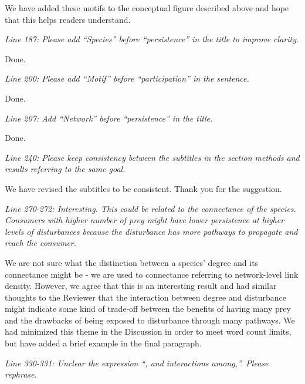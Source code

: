 \documentclass[12pt]{article}
\newcommand{\us}{\rm \setlength{\leftskip}{0.3cm} \setlength{\rightskip}{0.3cm}}
\newcommand{\them}{\it \setlength{\leftskip}{0cm} \setlength{\rightskip}{0cm}}
\begin{document}
        \us We have added these motifs to the conceptual figure described above and hope that this helps readers understand.
        
        \them
        Line 187: Please add ``Species'' before ``persistence'' in the title to improve clarity.
        
        \us
        Done.
        
        \them
        Line 200: Please add ``Motif'' before ``participation'' in the sentence.
        
        \us
        Done.
        
        \them
        Line 207: Add ``Network'' before ``persistence'' in the title.
        
        \us
        Done.
        
        \them
        Line 240: Please keep consistency between the subtitles in the section methods and results referring to the same goal.
        
        \us We have revised the subtitles to be consistent. Thank you for the suggestion.
        
        \them
        Line 270-272: Interesting. This could be related to the connectance of the species. Consumers with higher number of prey might have lower persistence at higher levels of disturbances because the disturbance has more pathways to propagate and reach the consumer.
        
        \us We are not sure what the distinction between a species' degree and its connectance might be - we are used to connectance referring to network-level link density. 
        However, we agree that this is an interesting result and had similar thoughts to the Reviewer that the interaction between degree and disturbance might indicate some kind of trade-off between the benefits of having many prey and the drawbacks of being exposed to disturbance through many pathways.
        We had minimized this theme in the Discussion in order to meet word count limits, but have added a brief example in the final paragraph.
        
        
        \them
        Line 330-331: Unclear the expression ``, and interactions among,''. Please rephrase.
        
\end{document}
